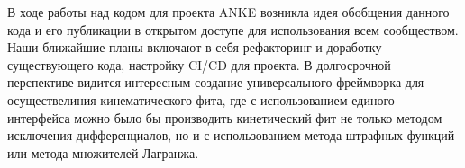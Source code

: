 
В ходе работы над кодом для проекта ANKE возникла идея обобщения данного кода и его публикации в открытом доступе для использования всем сообществом. Наши ближайшие планы включают в себя рефакторинг и доработку существующего кода, настройку CI/CD для проекта.
В долгосрочной перспективе видится интересным создание универсального фреймворка для осуществелиния кинематического фита, где с использованием единого интерфейса можно было бы производить кинетический фит не только методом исключения дифференциалов, но и с использованием метода штрафных функций или метода множителей Лагранжа.
